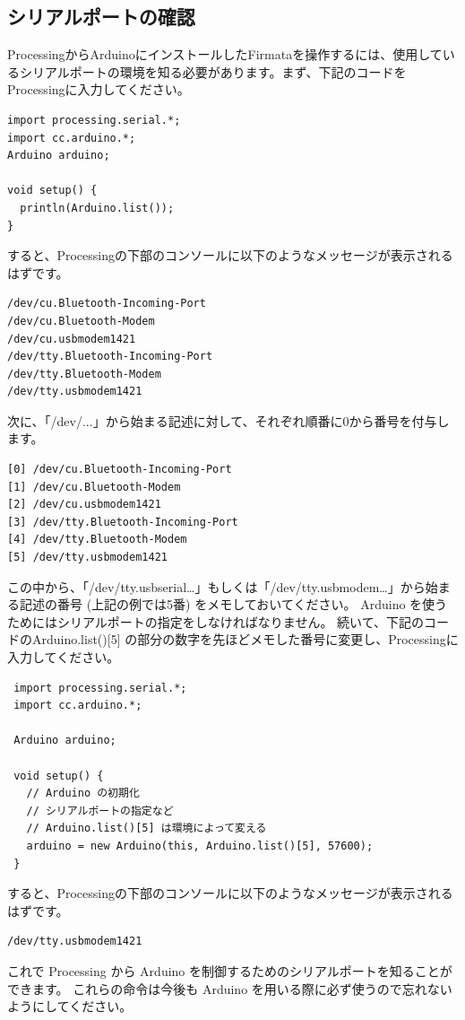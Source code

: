 \documentclass[11pt,a4paper]{jarticle}
\begin{document}
\subsection*{シリアルポートの確認}
ProcessingからArduinoにインストールしたFirmataを操作するには、使用しているシリアルポートの環境を知る必要があります。まず、下記のコードをProcessingに入力してください。
\begin{lstlisting}
import processing.serial.*;
import cc.arduino.*;
Arduino arduino;
 
void setup() {
  println(Arduino.list());
}
\end{lstlisting}
すると、Processingの下部のコンソールに以下のようなメッセージが表示されるはずです。
\begin{lstlisting}
/dev/cu.Bluetooth-Incoming-Port
/dev/cu.Bluetooth-Modem
/dev/cu.usbmodem1421
/dev/tty.Bluetooth-Incoming-Port
/dev/tty.Bluetooth-Modem
/dev/tty.usbmodem1421
\end{lstlisting}
次に、「/dev/...」から始まる記述に対して、それぞれ順番に0から番号を付与します。
\begin{lstlisting}
[0] /dev/cu.Bluetooth-Incoming-Port
[1] /dev/cu.Bluetooth-Modem
[2] /dev/cu.usbmodem1421
[3] /dev/tty.Bluetooth-Incoming-Port
[4] /dev/tty.Bluetooth-Modem
[5] /dev/tty.usbmodem1421
\end{lstlisting}
この中から、「/dev/tty.usbserial…」もしくは「/dev/tty.usbmodem…」から始まる記述の番号 (上記の例では5番) をメモしておいてください。
Arduino を使うためにはシリアルポートの指定をしなければなりません。
続いて、下記のコードのArduino.list()[5] の部分の数字を先ほどメモした番号に変更し、Processingに入力してください。
\begin{lstlisting}
 import processing.serial.*;
 import cc.arduino.*;

 Arduino arduino;

 void setup() {
   // Arduino の初期化
   // シリアルポートの指定など
   // Arduino.list()[5] は環境によって変える
   arduino = new Arduino(this, Arduino.list()[5], 57600);
 }
\end{lstlisting}
すると、Processingの下部のコンソールに以下のようなメッセージが表示されるはずです。
\begin{lstlisting}
/dev/tty.usbmodem1421
\end{lstlisting}

これで Processing から Arduino を制御するためのシリアルポートを知ることができます。
これらの命令は今後も Arduino を用いる際に必ず使うので忘れないようにしてください。
\end{document}
